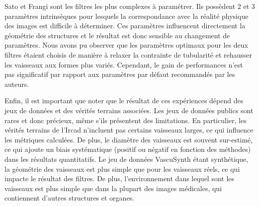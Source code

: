 Sato et Frangi sont les filtres les plus complexes à paramétrer. Ils possèdent $2$ et $3$ paramètres intrinsèques pour lesquels la correspondance avec la réalité physique des images est difficile à déterminer. Ces paramètres influencent directement la géométrie des structures et le résultat est donc sensible au changement de paramètres. Nous avons pu observer que les paramètres optimaux pour les deux filtres étaient choisis de manière à relaxer la contrainte de tubularité et rehausser les vaisseaux aux formes plus variés. Cependant, le gain de performances n'est pas significatif par rapport aux paramètres par défaut recommandés par les auteurs.


Enfin, il est important que noter que le résultat de ces expériences dépend des jeux de données et des vérités terrains associées. Les jeux de données publics sont rares et donc précieux, même s'ils présentent des limitations. En particulier, les vérités terrains de l'Ircad n'incluent pas certains vaisseaux larges, ce qui influence les métriques calculées. De plus, le diamètre des vaisseaux est souvent sur-estimé, ce qui ajoute un biais systématique (positif ou négatif en fonction des méthodes) dans les résultats quantitatifs. Le jeu de données VascuSynth étant synthétique, la géométrie des vaisseaux est plus simple que pour les vaisseaux réels, ce qui impacte le résultat des filtres. De plus, l'environnement dans lequel sont les vaisseaux est plus simple que dans la plupart des images médicales, qui contiennent d'autres structures et organes.



